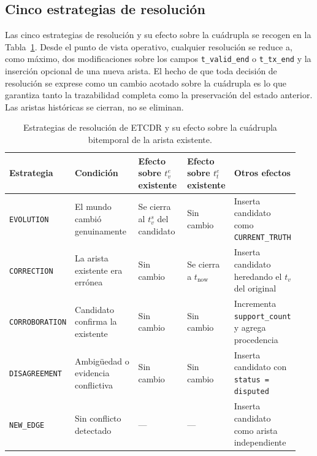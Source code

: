 \subsection{Cinco estrategias de resolución}

Las cinco estrategias de resolución y su efecto sobre la cuádrupla se recogen en la Tabla~\ref{tab:etcdr-strategies}. Desde el punto de vista operativo, cualquier resolución se reduce a, como máximo, dos modificaciones sobre los campos \texttt{t\_valid\_end} o \texttt{t\_tx\_end} y la inserción opcional de una nueva arista. El hecho de que toda decisión de resolución se exprese como un cambio acotado sobre la cuádrupla es lo que garantiza tanto la trazabilidad completa como la preservación del estado anterior. Las aristas históricas se cierran, no se eliminan.

\begin{table}[h]
\centering
\small
\begin{tabular}{p{0.16\linewidth}p{0.24\linewidth}p{0.18\linewidth}p{0.16\linewidth}p{0.20\linewidth}}
\hline
\textbf{Estrategia} & \textbf{Condición} & \textbf{Efecto sobre $t_v^e$ existente} & \textbf{Efecto sobre $t_t^e$ existente} & \textbf{Otros efectos} \\ \hline
\texttt{EVOLUTION} & El mundo cambió genuinamente & Se cierra al $t_v^s$ del candidato & Sin cambio & Inserta candidato como \texttt{CURRENT\_TRUTH} \\
\texttt{CORRECTION} & La arista existente era errónea & Sin cambio & Se cierra a $t_{\text{now}}$ & Inserta candidato heredando el $t_v$ del original \\
\texttt{CORROBORATION} & Candidato confirma la existente & Sin cambio & Sin cambio & Incrementa \texttt{support\_count} y agrega procedencia \\
\texttt{DISAGREEMENT} & Ambigüedad o evidencia conflictiva & Sin cambio & Sin cambio & Inserta candidato con \texttt{status = disputed} \\
\texttt{NEW\_EDGE} & Sin conflicto detectado & --- & --- & Inserta candidato como arista independiente \\ \hline
\end{tabular}
\caption{Estrategias de resolución de ETCDR y su efecto sobre la cuádrupla bitemporal de la arista existente.}
\label{tab:etcdr-strategies}
\end{table}

